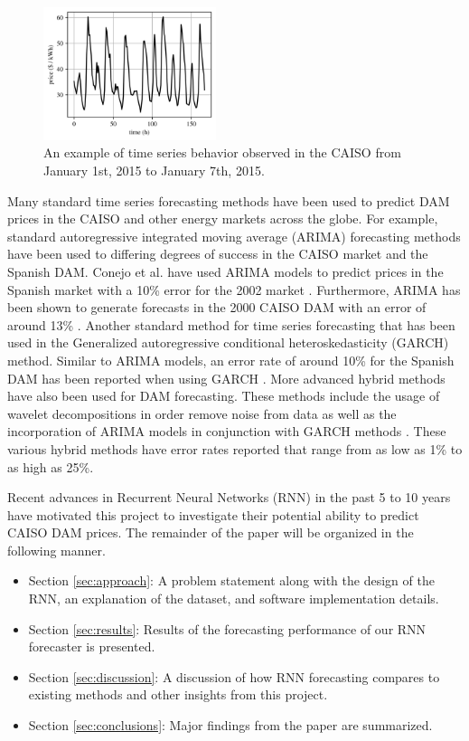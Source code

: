 \documentclass[sigconf]{acmart}
\begin{document}
\begin{figure}[h]
\includegraphics[width=0.45\textwidth]{fig_1.png}
\caption{An example of time series behavior observed in the CAISO from January 1st, 2015 to January 7th, 2015.}
\label{fig:ex_prices}
\end{figure}

Many standard time series forecasting methods have been used to predict DAM prices in the CAISO and other energy markets across the globe. For example, standard autoregressive integrated moving average (ARIMA) forecasting methods have been used to differing degrees of success in the CAISO market and the Spanish DAM. Conejo et al. have used ARIMA models to predict prices in the Spanish market with a 10\% error for the 2002 market \cite{Conejo2005a}. Furthermore, ARIMA has been shown to generate forecasts in the 2000 CAISO DAM with an error of around 13\% \cite{Garcia2005}. Another standard method for time series forecasting that has been used in the  Generalized autoregressive conditional heteroskedasticity (GARCH) method. Similar to ARIMA models, an error rate of around 10\% for the Spanish DAM has been reported when using GARCH \cite{Garcia2005}. More advanced hybrid methods have also been used for DAM forecasting. These methods include the usage of wavelet decompositions in order remove noise from data as well as the incorporation of ARIMA models in conjunction with GARCH methods \cite{Conejo2005,Tan2010,Amjady2008,Wang2012}. These various hybrid methods have error rates reported that range from as low as 1\% to as high as 25\%. 

Recent advances in Recurrent Neural Networks (RNN) in the past 5 to 10 years have motivated this project to investigate their potential ability to predict CAISO DAM prices. The remainder of the paper will be organized in the following manner.

\begin{itemize}
	\item Section \ref{sec:approach}: A problem statement along with the design of the RNN, an explanation of the dataset, and software implementation details.
	\item Section \ref{sec:results}: Results of the forecasting performance of our RNN forecaster is presented.
	\item Section \ref{sec:discussion}: A discussion of how RNN forecasting compares to existing methods and other insights from this project.
	\item Section \ref{sec:conclusions}: Major findings from the paper are summarized.
\end{itemize}
\end{document}
